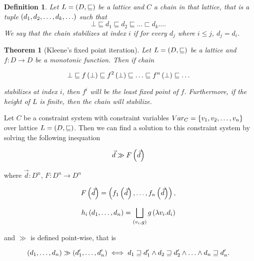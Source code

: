 \documentclass[..thesis.tex]{subfiles}
\newtheorem{defin}{Definition}[section]
\newtheorem{kleene-fix}{Theorem}[section]
\begin{document}
\begin{defin}
  Let $L = \left( D, \sqsubseteq \right)$ be a lattice and $C$ a \textit{chain} in that lattice, that is a tuple $ \left( d_1, d_2, \ldots, d_k, \ldots \right)$ such that
  \begin{equation*}
    \bot \sqsubseteq d_1 \sqsubseteq d_2 \sqsubseteq \ldots \sqsubset d_k \ldots \text{.}
  \end{equation*}
  We say that the chain \textit{stabilizes} at index $i$ if for every $d_j$ where $ i \leq j$, $ d_j = d_i$. 
\end{defin}

\begin{kleene-fix}[Kleene's fixed point iteration]
Let $L = \left( D, \sqsubseteq \right) $ be a lattice and $f : D \to D$ be a monotonic function. Then if chain 

\begin{equation*}
\bot \sqsubseteq f \left( \bot \right) \sqsubseteq f^2 \left( \bot \right) \sqsubseteq \ldots \sqsubseteq f^n \left( \bot \right) \sqsubseteq \ldots
\end{equation*}

stabilizes at index $i$, then $f^{i}$ will be the least fixed point of $f$. Furthermore, if the height of $L$ is finite, then the chain will stabilize.
\end{kleene-fix}

Let $C$ be a constraint system with constraint variables $Var_C= \left\lbrace v_1, v_2, \ldots, v_n \right\rbrace$ over lattice $L = \left( D, \sqsubseteq \right)$. Then we can find a solution to this constraint system by solving the following inequation

\begin{equation}
  \label{one-function}
  \vec{d} \gg F \left( \vec{d}  \right) 
\end{equation}


where $\vec{d} : D^n$, $F :  D^{n} \to D^{n}$

\begin{equation*}
  F \left( \vec{d} \right)  = \left( f_1 \left( \vec{d} \right) , \ldots, f_n \left( \vec{d} \right) \right) \text{,}
\end{equation*}   


\begin{equation*}
  h_i \left( d_1, \ldots, d_n \right) = \bigsqcup_{\left( v_i, g \right)} g \left( \lambda v_i. d_i \right)
\end{equation*}

and $\gg$ is defined point-wise, that is 

\begin{equation*}
\left( d_1, \ldots, d_n \right) \gg \left( d_1', \ldots, d_n' \right) \iff  d_1 \sqsupseteq d_1' \land d_2 \sqsupseteq d_2' \land \ldots \land d_n \sqsupseteq d_n' \text{.}
\end{equation*}
\end{document}
